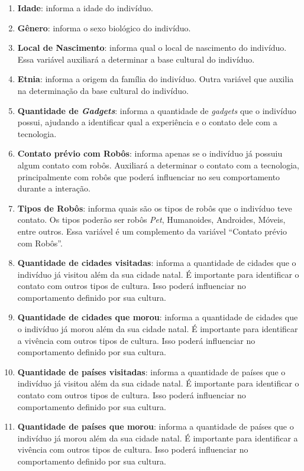 \begin{enumerate}
	\item \textbf{Idade}: informa a idade do indivíduo.
	\item \textbf{Gênero}: informa o sexo biológico do indivíduo.
	\item \textbf{Local de Nascimento}: informa qual o local de nascimento do indivíduo. Essa variável auxiliará a determinar a base cultural do indivíduo.
	\item \textbf{Etnia}: informa a origem da família do indivíduo. Outra variável que auxilia na determinação da base cultural do indivíduo.
	\item \textbf{Quantidade de \emph{Gadgets}}: informa a quantidade de \emph{gadgets} que o indivíduo possui, ajudando a identificar qual a experiência e o contato dele com a tecnologia.
	\item \textbf{Contato prévio com Robôs}: informa apenas se o indivíduo já possuiu algum contato com robôs. Auxiliará a determinar o contato com a tecnologia, principalmente com robôs que poderá influenciar no seu comportamento durante a interação.
	\item \textbf{Tipos de Robôs}: informa quais são os tipos de robôs que o indivíduo teve contato. Os tipos poderão ser robôs \emph{Pet}, Humanoides, Androides, Móveis, entre outros. Essa variável é um complemento da variável ``Contato prévio com Robôs''.
	\item \textbf{Quantidade de cidades visitadas}: informa a quantidade de cidades que o indivíduo já visitou além da sua cidade natal. É importante para identificar o contato com outros tipos de cultura. Isso poderá influenciar no comportamento definido por sua cultura.
	\item \textbf{Quantidade de cidades que morou}: informa a quantidade de cidades que o indivíduo já morou além da sua cidade natal. É importante para identificar a vivência com outros tipos de cultura. Isso poderá influenciar no comportamento definido por sua cultura.
	\item \textbf{Quantidade de países visitadas}: informa a quantidade de países que o indivíduo já visitou além da sua cidade natal. É importante para identificar o contato com outros tipos de cultura. Isso poderá influenciar no comportamento definido por sua cultura.
	\item \textbf{Quantidade de países que morou}: informa a quantidade de países que o indivíduo já morou além da sua cidade natal. É importante para identificar a vivência com outros tipos de cultura. Isso poderá influenciar no comportamento definido por sua cultura.
\end{enumerate}

